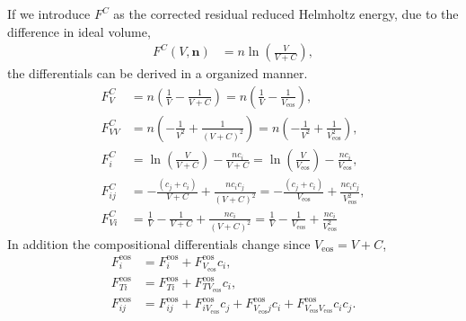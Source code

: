 \documentclass[english]{../thermomemo/thermomemo}
\newcommand*{\vektor}[1]{\boldsymbol{#1}}%
\newcommand{\eos}{\ensuremath{\text{eos}}\xspace}
\begin{document}
If we introduce $F^C$ as the corrected residual reduced Helmholtz energy, due to
the difference in ideal volume,
\begin{align}
  F^C(V,\vektor{n}) &= n \ln \left(\frac{V}{V+C} \right),
  \label{eq:F_corr}
\end{align}
the differentials can be derived in a organized manner.
\begin{align}
  F^C_{V} &= n \left(\frac{1}{V} - \frac{1}{V+C} \right) = n \left(\frac{1}{V} - \frac{1}{V_{\eos}} \right), \\
  F^C_{VV} &= n \left(-\frac{1}{V^2} + \frac{1}{\left(V+C\right)^2} \right) = n \left(-\frac{1}{V^2} + \frac{1}{V_{\eos}^2} \right), \\
  F^C_{i} &= \ln \left(\frac{V}{V+C} \right) - \frac{nc_i}{V+C} = \ln \left(\frac{V}{V_{\eos}} \right) - \frac{nc_i}{V_{\eos}}, \\
  F^C_{ij} &= -\frac{\left(c_j + c_i \right)}{V+C} +  \frac{n c_ic_j}{\left(V+C\right)^2} = -\frac{\left(c_j + c_i \right)}{V_{\eos}} +  \frac{n c_ic_j}{V_{\eos}^2}, \\
  F^C_{Vi} &= \frac{1}{V} - \frac{1}{V+C} + \frac{nc_i}{\left(V+C\right)^2} =  \frac{1}{V} - \frac{1}{V_{\eos}} + \frac{nc_i}{V_{\eos}^2}
\end{align}
In addition the compositional differentials change since $V_{\eos} = V + C$,
\begin{align}
  F^{\eos}_{i} &= F^{\eos}_{i} + F^{\eos}_{V_{\eos}} c_i , \label{eq:Fi}\\
  F^{\eos}_{Ti} &= F^{\eos}_{Ti} + F^{\eos}_{TV_{\eos}} c_i , \\
  F^{\eos}_{ij} &= F^{\eos}_{ij} + F^{\eos}_{iV_{\eos}} c_j + F^{\eos}_{V_{\eos}j} c_i + F^{\eos}_{V_{\eos}V_{\eos}} c_ic_j . \label{eq:Fij}
\end{align}
\end{document}
